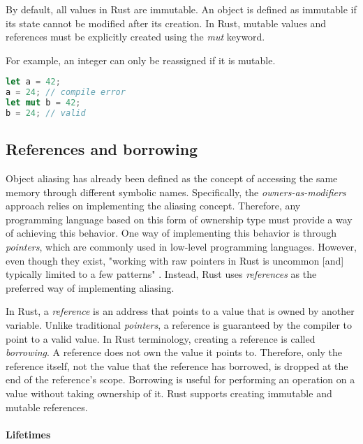 \documentclass[sigplan,11pt,nonacm]{acmart}
\begin{document}
By default, all values in Rust are immutable.
An object is defined as immutable if its state cannot be modified after its creation.
In Rust, mutable values and references must be explicitly created using the \emph{mut} keyword.

For example, an integer can only be reassigned if it is mutable.
\begin{lstlisting}[language=Rust]
let a = 42;
a = 24; // compile error
let mut b = 42;
b = 24; // valid
\end{lstlisting}


\subsection{References and borrowing}
\label{sec:rust-references}

Object aliasing has already been defined as the concept of accessing the same memory through different symbolic names.
Specifically, the \emph{owners-as-modifiers} approach relies on implementing the aliasing concept.
Therefore, any programming language based on this form of ownership type must provide a way of achieving this behavior.
One way of implementing this behavior is through \emph{pointers}, which are commonly used in low-level programming languages.
However, even though they exist, "working with raw pointers in Rust is uncommon [and] typically limited to a few patterns" \cite{rust-pointer-documentation}.
Instead, Rust uses \emph{references} as the preferred way of implementing aliasing.

In Rust, a \emph{reference} is an address that points to a value that is owned by another variable.
Unlike traditional \emph{pointers}, a reference is guaranteed by the compiler to point to a valid value.
In Rust terminology, creating a reference is called \emph{borrowing}.
A reference does not own the value it points to.
Therefore, only the reference itself, not the value that the reference has borrowed, is dropped at the end of the reference's scope.
Borrowing is useful for performing an operation on a value without taking ownership of it.
Rust supports creating immutable and mutable references.

\paragraph{Lifetimes}
\label{sec:rust-lifetimes}
\end{document}
